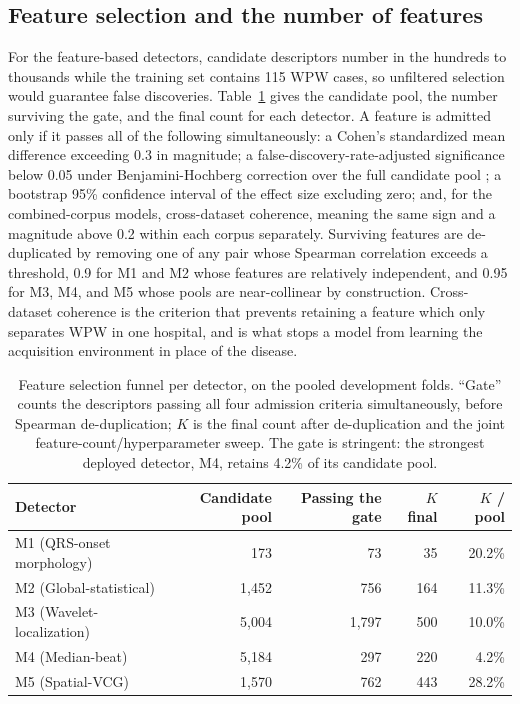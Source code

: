 \documentclass[11pt]{article}
\begin{document}
\subsection{Feature selection and the number of features}
\label{sec:feats}

For the feature-based detectors, candidate descriptors number in the hundreds to thousands while the training set contains 115 WPW cases, so unfiltered selection would guarantee false discoveries. Table~\ref{tab:funnel} gives the candidate pool, the number surviving the gate, and the final count for each detector. A feature is admitted only if it passes all of the following simultaneously: a Cohen's standardized mean difference exceeding 0.3 in magnitude; a false-discovery-rate-adjusted significance below 0.05 under Benjamini-Hochberg correction over the full candidate pool \cite{bh}; a bootstrap 95\% confidence interval of the effect size excluding zero; and, for the combined-corpus models, cross-dataset coherence, meaning the same sign and a magnitude above 0.2 within each corpus separately. Surviving features are de-duplicated by removing one of any pair whose Spearman correlation exceeds a threshold, 0.9 for M1 and M2 whose features are relatively independent, and 0.95 for M3, M4, and M5 whose pools are near-collinear by construction. Cross-dataset coherence is the criterion that prevents retaining a feature which only separates WPW in one hospital, and is what stops a model from learning the acquisition environment in place of the disease.

\begin{table}[t]
  \centering
  \small
  \caption{Feature selection funnel per detector, on the pooled development folds. ``Gate'' counts the descriptors passing all four admission criteria simultaneously, before Spearman de-duplication; $K$ is the final count after de-duplication and the joint feature-count/hyperparameter sweep. The gate is stringent: the strongest deployed detector, M4, retains 4.2\% of its candidate pool.}
  \label{tab:funnel}
  \begin{tabular}{@{}lrrrr@{}}
    \toprule
    Detector & Candidate pool & Passing the gate & $K$ final & $K$ / pool \\
    \midrule
    M1 (QRS-onset morphology) & 173   & 73    & 35  & 20.2\% \\
    M2 (Global-statistical)   & 1{,}452 & 756   & 164 & 11.3\% \\
    M3 (Wavelet-localization) & 5{,}004 & 1{,}797 & 500 & 10.0\% \\
    M4 (Median-beat)          & 5{,}184 & 297   & 220 & 4.2\%  \\
    M5 (Spatial-VCG)          & 1{,}570 & 762   & 443 & 28.2\% \\
    \bottomrule
  \end{tabular}
\end{table}
\end{document}
